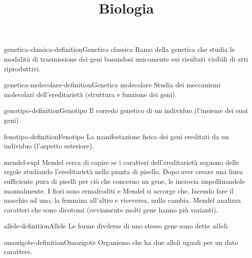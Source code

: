\documentclass[preview]{standalone}
\begin{document}
\title{Biologia}
\genpage

\begin{snippetdefinition}{genetica-classica-definition}{Genetica classica}
    Ramo della genetica che studia le modalità di trasmissione
    dei geni basandosi unicamente sui risultati visibili di atti riproduttivi.
\end{snippetdefinition}

\begin{snippetdefinition}{genetica-molecolare-definition}{Genetica molecolare}
    Studia dei meccanismi molecolari dell'ereditarietà (struttura e funzione dei geni).
\end{snippetdefinition}

\begin{snippetdefinition}{genotipo-definition}{Genotipo}
    Il corredo genetico di un individuo (l'insieme dei suoi geni).
\end{snippetdefinition}

\begin{snippetdefinition}{fenotipo-definition}{Fenotipo}
    La manifestazione fisica dei geni ereditati da un individuo
    (l'aspetto esteriore).
\end{snippetdefinition}


\begin{snippet}{mendel-expl}
    Mendel cerca di capire se i caratteri dell'ereditarietà
    seguono delle regole studiando l'ereditarietà nella pianta di pisello.
    Dopo aver creare una linea sufficiente pura di piselli per ciò che concerno un gene,
    le incrocia impollinandole manualmente.
    I fiori sono ermafroditi e Mendel si accorge che, facendo fare il maschio ad uno, la femmina all'altro
    e viceversa, nulla cambia.
    Mendel analizza caratteri che sono dicotomi (ovviamente molti gene hanno più varianti).
\end{snippet}

\begin{snippetdefinition}{allele-definition}{Allele}
    Le forme divderse di uno stesso gene sono dette \textit{alleli}.
\end{snippetdefinition}

\begin{snippetdefinition}{omozigote-definition}{Omozigote}
    Organismo che ha due alleli uguali per un dato carattere.
\end{snippetdefinition}
\end{document}
